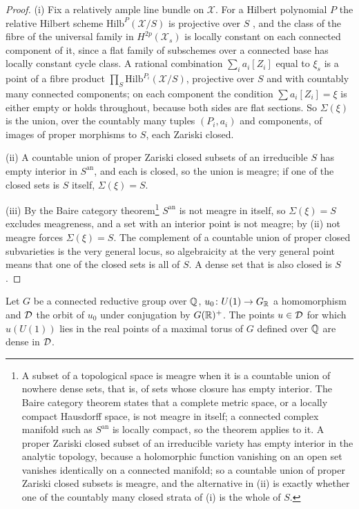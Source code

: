\begin{proof}
(i) Fix a relatively ample line bundle on $\mathcal{X}$. For a Hilbert polynomial $P$ the relative Hilbert scheme $\mathrm{Hilb}^{P}(\mathcal{X}/S)$ is projective over $S$ \cite{Gro61}, and the class of the fibre of the universal family in $H^{2p}(\mathcal{X}_{s})$ is locally constant on each connected component of it, since a flat family of subschemes over a connected base has locally constant cycle class. A rational combination $\sum_{i}a_{i}[Z_{i}]$ equal to $\xi_{s}$ is a point of a fibre product $\prod_{S}\mathrm{Hilb}^{P_{i}}(\mathcal{X}/S)$, projective over $S$ and with countably many connected components; on each component the condition $\sum a_{i}[Z_{i}]=\xi$ is either empty or holds throughout, because both sides are flat sections. So $\Sigma(\xi)$ is the union, over the countably many tuples $(P_{i},a_{i})$ and components, of images of proper morphisms to $S$, each Zariski closed.

(ii) A countable union of proper Zariski closed subsets of an irreducible $S$ has empty interior in $S^{\mathrm{an}}$, and each is closed, so the union is meagre; if one of the closed sets is $S$ itself, $\Sigma(\xi)=S$.

(iii) By the Baire category theorem\footnote{A subset of a topological space is meagre when it is a countable union of nowhere dense sets, that is, of sets whose closure has empty interior. The Baire category theorem states that a complete metric space, or a locally compact Hausdorff space, is not meagre in itself; a connected complex manifold such as $S^{\mathrm{an}}$ is locally compact, so the theorem applies to it. A proper Zariski closed subset of an irreducible variety has empty interior in the analytic topology, because a holomorphic function vanishing on an open set vanishes identically on a connected manifold; so a countable union of proper Zariski closed subsets is meagre, and the alternative in (ii) is exactly whether one of the countably many closed strata of (i) is the whole of $S$.} $S^{\mathrm{an}}$ is not meagre in itself, so $\Sigma(\xi)=S$ excludes meagreness, and a set with an interior point is not meagre; by (ii) not meagre forces $\Sigma(\xi)=S$. The complement of a countable union of proper closed subvarieties is the very general locus, so algebraicity at the very general point means that one of the closed sets is all of $S$. A dense set that is also closed is $S$.
\end{proof}

\begin{lemma}\label{lem:cmdense}
Let $G$ be a connected reductive group over $\mathbb{Q}$, $u_{0}\colon U(1)\to G_{\mathbb{R}}$ a homomorphism and $\mathcal{D}$ the orbit of $u_{0}$ under conjugation by $G(\mathbb{R})^{+}$. The points $u\in\mathcal{D}$ for which $u(U(1))$ lies in the real points of a maximal torus of $G$ defined over $\mathbb{Q}$ are dense in $\mathcal{D}$.
\end{lemma}

